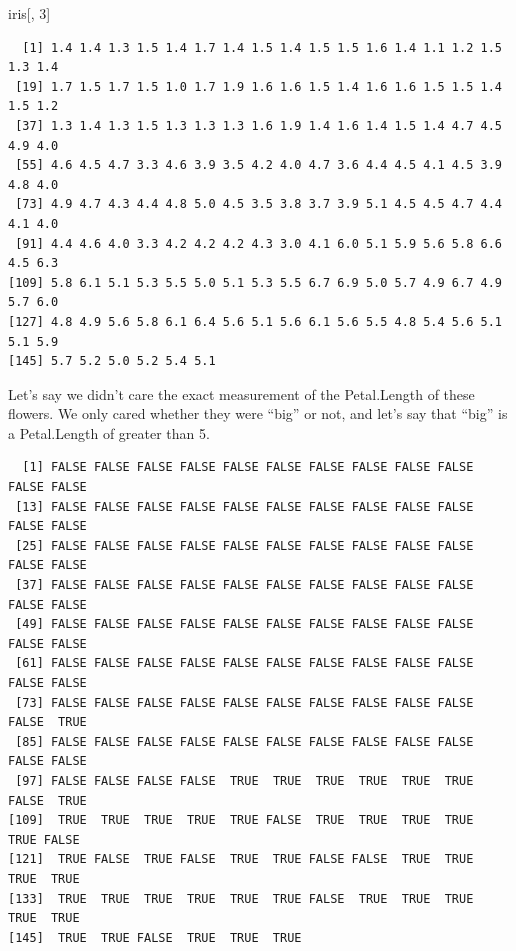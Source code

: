 \documentclass[
  letterpaper,
  DIV=11,
  numbers=noendperiod]{scrreprt}
\newenvironment{Shaded}{\begin{snugshade}}{\end{snugshade}}
\newcommand{\DecValTok}[1]{\textcolor[rgb]{0.68,0.00,0.00}{#1}}
\newcommand{\NormalTok}[1]{\textcolor[rgb]{0.00,0.23,0.31}{#1}}
\newcommand{\SpecialCharTok}[1]{\textcolor[rgb]{0.37,0.37,0.37}{#1}}
\begin{document}
\begin{Shaded}
\begin{Highlighting}[]
\NormalTok{iris[, }\DecValTok{3}\NormalTok{]}
\end{Highlighting}
\end{Shaded}

\begin{verbatim}
  [1] 1.4 1.4 1.3 1.5 1.4 1.7 1.4 1.5 1.4 1.5 1.5 1.6 1.4 1.1 1.2 1.5 1.3 1.4
 [19] 1.7 1.5 1.7 1.5 1.0 1.7 1.9 1.6 1.6 1.5 1.4 1.6 1.6 1.5 1.5 1.4 1.5 1.2
 [37] 1.3 1.4 1.3 1.5 1.3 1.3 1.3 1.6 1.9 1.4 1.6 1.4 1.5 1.4 4.7 4.5 4.9 4.0
 [55] 4.6 4.5 4.7 3.3 4.6 3.9 3.5 4.2 4.0 4.7 3.6 4.4 4.5 4.1 4.5 3.9 4.8 4.0
 [73] 4.9 4.7 4.3 4.4 4.8 5.0 4.5 3.5 3.8 3.7 3.9 5.1 4.5 4.5 4.7 4.4 4.1 4.0
 [91] 4.4 4.6 4.0 3.3 4.2 4.2 4.2 4.3 3.0 4.1 6.0 5.1 5.9 5.6 5.8 6.6 4.5 6.3
[109] 5.8 6.1 5.1 5.3 5.5 5.0 5.1 5.3 5.5 6.7 6.9 5.0 5.7 4.9 6.7 4.9 5.7 6.0
[127] 4.8 4.9 5.6 5.8 6.1 6.4 5.6 5.1 5.6 6.1 5.6 5.5 4.8 5.4 5.6 5.1 5.1 5.9
[145] 5.7 5.2 5.0 5.2 5.4 5.1
\end{verbatim}

Let's say we didn't care the exact measurement of the Petal.Length of
these flowers. We only cared whether they were ``big'' or not, and let's
say that ``big'' is a Petal.Length of greater than 5.

\begin{Shaded}
\end{Shaded}

\begin{verbatim}
  [1] FALSE FALSE FALSE FALSE FALSE FALSE FALSE FALSE FALSE FALSE FALSE FALSE
 [13] FALSE FALSE FALSE FALSE FALSE FALSE FALSE FALSE FALSE FALSE FALSE FALSE
 [25] FALSE FALSE FALSE FALSE FALSE FALSE FALSE FALSE FALSE FALSE FALSE FALSE
 [37] FALSE FALSE FALSE FALSE FALSE FALSE FALSE FALSE FALSE FALSE FALSE FALSE
 [49] FALSE FALSE FALSE FALSE FALSE FALSE FALSE FALSE FALSE FALSE FALSE FALSE
 [61] FALSE FALSE FALSE FALSE FALSE FALSE FALSE FALSE FALSE FALSE FALSE FALSE
 [73] FALSE FALSE FALSE FALSE FALSE FALSE FALSE FALSE FALSE FALSE FALSE  TRUE
 [85] FALSE FALSE FALSE FALSE FALSE FALSE FALSE FALSE FALSE FALSE FALSE FALSE
 [97] FALSE FALSE FALSE FALSE  TRUE  TRUE  TRUE  TRUE  TRUE  TRUE FALSE  TRUE
[109]  TRUE  TRUE  TRUE  TRUE  TRUE FALSE  TRUE  TRUE  TRUE  TRUE  TRUE FALSE
[121]  TRUE FALSE  TRUE FALSE  TRUE  TRUE FALSE FALSE  TRUE  TRUE  TRUE  TRUE
[133]  TRUE  TRUE  TRUE  TRUE  TRUE  TRUE FALSE  TRUE  TRUE  TRUE  TRUE  TRUE
[145]  TRUE  TRUE FALSE  TRUE  TRUE  TRUE
\end{verbatim}
\end{document}
